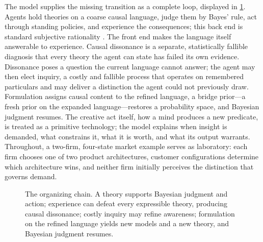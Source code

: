 \documentclass[11pt]{article}
\theoremstyle{definition}
\begin{document}
The model supplies the missing transition as a complete loop, displayed in \cref{fig:chain}.
Agents hold theories on a coarse causal language, judge them by Bayes' rule, act through standing policies, and experience the consequences; this back end is standard subjective rationality \citep{KalaiLehrer1993b,Ryall2003}.
The front end makes the language itself answerable to experience.
Causal dissonance is a separate, statistically fallible diagnosis that every theory the agent can state has failed its own evidence.
Dissonance poses a question the current language cannot answer; the agent may then elect inquiry, a costly and fallible process that operates on remembered particulars and may deliver a distinction the agent could not previously draw.
Formulation assigns causal content to the refined language, a bridge prior---a fresh prior on the expanded language---restores a probability space, and Bayesian judgment resumes.
The creative act itself, how a mind produces a new predicate, is treated as a primitive technology; the model explains when insight is demanded, what constrains it, what it is worth, and what its output warrants.
Throughout, a two-firm, four-state market example serves as laboratory: each firm chooses one of two product architectures, customer configurations determine which architecture wins, and neither firm initially perceives the distinction that governs demand.

\begin{figure}[t]
\centering
{}
\caption{The organizing chain.
A theory supports Bayesian judgment and action; experience can defeat every expressible theory, producing causal dissonance; costly inquiry may refine awareness; formulation on the refined language yields new models and a new theory, and Bayesian judgment resumes.}
\label{fig:chain}
\end{figure}
\end{document}
